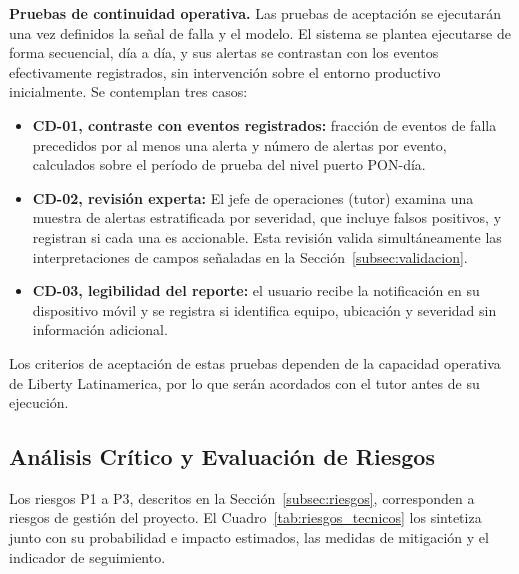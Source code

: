 \documentclass[12pt,a4paper]{article}
\begin{document}
\textbf{Pruebas de continuidad operativa.} 
\newline
Las pruebas de aceptación se ejecutarán una vez definidos la señal de falla y el modelo. El sistema se plantea ejecutarse de forma secuencial, día a día,  y sus alertas se contrastan con los eventos efectivamente registrados, sin intervención
 sobre el entorno productivo inicialmente. Se contemplan tres casos:
\begin{itemize}
    \item \textbf{CD-01, contraste con eventos registrados:} fracción de eventos de falla precedidos por al menos una alerta y número de alertas por evento, calculados sobre el período de prueba del nivel puerto PON-día.
    \item \textbf{CD-02, revisión experta:} El jefe de operaciones (tutor) examina una muestra de alertas estratificada por severidad, que incluye falsos positivos, y registran si cada una es accionable. Esta revisión valida simultáneamente las interpretaciones de campos señaladas en la Sección~\ref{subsec:validacion}.
    \item \textbf{CD-03, legibilidad del reporte:} el usuario recibe la notificación en su dispositivo móvil y se registra si identifica equipo, ubicación y severidad sin información adicional.
\end{itemize}
Los criterios de aceptación de estas pruebas dependen de la capacidad operativa de Liberty Latinamerica, por lo que serán acordados con el tutor antes de su ejecución. 

\subsection{Análisis Crítico y Evaluación de Riesgos}
\label{subsec:riesgos_tecnicos}
\noindent
Los riesgos P1 a P3, descritos en la Sección~\ref{subsec:riesgos}, corresponden a riesgos de gestión del proyecto. El Cuadro~\ref{tab:riesgos_tecnicos} los sintetiza junto con su probabilidad e impacto estimados, las medidas de mitigación y el indicador de seguimiento.
\end{document}
